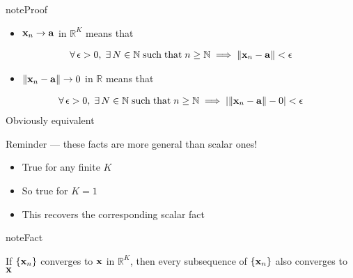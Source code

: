 \documentclass[letterpaper,10pt,english]{jupyterBook}
\begin{document}
\begin{sphinxadmonition}{note}{Proof}
\begin{itemize}
\item {} 
\sphinxAtStartPar
\({\bf x}_n \to {\bf a}\) in \(\mathbb{R}^K\) means that

\end{itemize}
\begin{equation*}
\begin{split}
\forall \, \epsilon > 0, 
\;
\exists \, N \in \mathbb{N}
\; \mathrm{such\;that}  \; 
n \geq \mathbb{N} \implies \| {\bf x}_n - {\bf a} \| < \epsilon
\end{split}
\end{equation*}\begin{itemize}
\item {} 
\sphinxAtStartPar
\(\|{\bf x}_n - {\bf a}\| \to 0\) in \(\mathbb{R}\) means that

\end{itemize}
\begin{equation*}
\begin{split}
\forall\,  \epsilon > 0, 
\;
\exists \, N \in \mathbb{N}
\; \mathrm{such\;that}  \;
n \geq \mathbb{N} \implies | \| {\bf x}_n - {\bf a} \| - 0 | < \epsilon
\end{split}
\end{equation*}
\sphinxAtStartPar
Obviously equivalent
\end{sphinxadmonition}

\sphinxAtStartPar
Reminder — these facts are more general than scalar ones!
\begin{itemize}
\item {} 
\sphinxAtStartPar
True for any finite \(K\)

\item {} 
\sphinxAtStartPar
So true for \(K = 1\)

\item {} 
\sphinxAtStartPar
This recovers the corresponding scalar fact

\end{itemize}

\sphinxAtStartPar
{}

\begin{sphinxadmonition}{note}{Fact}

\sphinxAtStartPar
If \(\{ {\bf x}_n \}\) converges to \({\bf x}\) in \(\mathbb{R}^K\), then every
subsequence of \(\{{\bf x}_n\}\) also converges to \({\bf x}\)
\end{sphinxadmonition}
\end{document}
